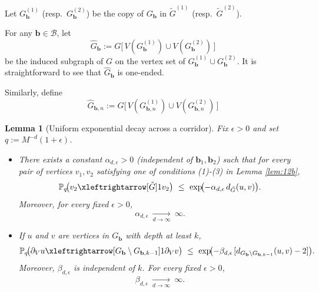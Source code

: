 \documentclass[11pt]{amsart}
\theoremstyle{plain}
\newtheorem{lemma}[theorem]{Lemma}
\numberwithin{equation}{section}
\numberwithin{figure}{section}
\newcommand\PP{{\mathbb P}}
\begin{document}
Let $G_{\mathbf{b}}^{(1)}$ (resp.\ $G_{\mathbf{b}}^{(2)}$) be the copy of $G_{\mathbf{b}}$ in $\tilde{G}^{(1)}$ (resp.\ $\tilde{G}^{(2)}$).


For any $\mathbf b\in\mathcal B$, let
\[
\widehat G_{\mathbf b}:=
G\Big[\,V(G_{\mathbf b}^{(1)})\cup V(G_{\mathbf b}^{(2)})\,\Big]
\]
be the induced subgraph of $G$ on the vertex set of
$G_{\mathbf b}^{(1)}\cup G_{\mathbf b}^{(2)}$.
It is straightforward to see that $\widehat G_{\mathbf b}$ is one-ended.

Similarly, define 
\[
\widehat G_{\mathbf b,n}:=
G\Big[\,V(G_{\mathbf b,n}^{(1)})\cup V(G_{\mathbf b,n}^{(2)})\,\Big]
\]

























\begin{lemma}[Uniform exponential decay across a corridor]\label{lem:ed}
Fix $\epsilon>0$ and set $q:=M^{-d}(1+\epsilon)$.
\begin{itemize}
\item There exists a constant $\alpha_{d,\epsilon}>0$ (independent of $\mathbf b_1,\mathbf{b}_2$) such that
for every pair of vertices $v_1,v_2$ satisfying one of conditions (1)-(3) in Lemma \ref{lem:12b},
\begin{equation}\label{ed}
\PP_{q}\!\bigl(v_2\xleftrightarrow[\tilde{G}]{1} v_2\bigr)
\ \le\ \exp\!\bigl(-\alpha_{d,\epsilon}\, d_{\tilde{G}}(u,v)\bigr).
\end{equation}
Moreover, for every fixed $\epsilon>0$,
\begin{equation}\label{ed1}
\alpha_{d,\epsilon}\ \xrightarrow[d\to\infty]{}\ \infty.
\end{equation}
\item If $u$ and $v$ are vertices in $G_{\mathbf{b}}$ with depth at least $k$,
\begin{equation}\label{ed2}
\PP_{q}\!\bigl(\partial_V u\xleftrightarrow[G_{\mathbf b}\setminus G_{\mathbf b,k-1}]{1}\partial_V v\bigr)
\ \le\ \exp\!\bigl(-\beta_{d,\epsilon}\, [d_{G_{\mathbf b}\setminus G_{\mathbf b,k-1}}(u,v)-2]\bigr).
\end{equation}
Moreover, $\beta_{d,\epsilon}$ is independent of $k$. For every fixed $\epsilon>0$,
\begin{equation}\label{ed3}
\beta_{d,\epsilon}\ \xrightarrow[d\to\infty]{}\ \infty.
\end{equation}
\end{itemize}
\end{lemma}
\end{document}

